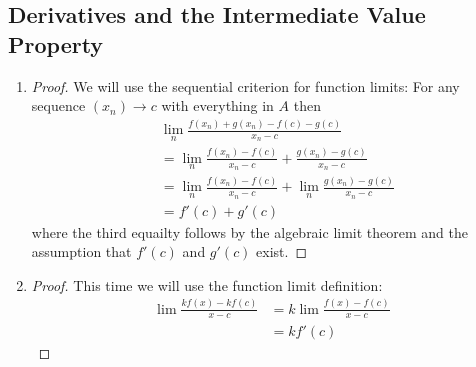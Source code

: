 \subsection{Derivatives and the Intermediate Value Property}

\begin{enumerate}[label=(\roman*)]
    \item 
    \begin{proof}
        We will use the sequential criterion for function limits:
        For any sequence $(x_n)\rightarrow c$ with everything in 
        $A$ then 
        \begin{align*}
            & \lim_n \frac{f(x_n)+g(x_n)-f(c)-g(c)}{x_n-c} \\
            &= \lim_n \frac{f(x_n)-f(c)}{x_n-c} + \frac{g(x_n)-g(c)}{x_n-c} \\
            &= \lim_n \frac{f(x_n)-f(c)}{x_n-c} + \lim_n \frac{g(x_n)-g(c)}{x_n-c} \\
            &= f'(c) + g'(c)
        \end{align*}
        where the third equailty follows by the algebraic limit theorem and 
        the assumption that $f'(c)$ and $g'(c)$ exist.
    \end{proof}

    \item
    \begin{proof}
        This time we will use the function limit definition:
        \begin{align*}
            \lim \frac{kf(x)-kf(c)}{x-c} &= k\lim \frac{f(x)-f(c)}{x-c} \\
                                        &= kf'(c)
        \end{align*}
    \end{proof}
\end{enumerate}

